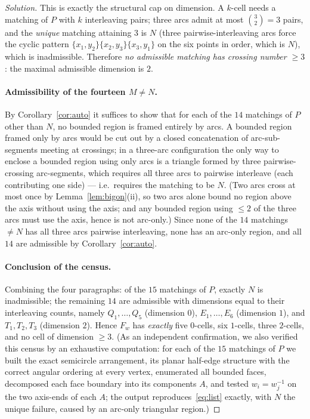 \documentclass{amsart}
\theoremstyle{definition}
\begin{document}
\begin{proof}[Solution]
This is exactly the structural cap on dimension. A $k$-cell needs a matching of $P$ with $k$
interleaving pairs; three arcs admit at most $\binom32=3$ pairs, and the \emph{unique} matching
attaining $3$ is $N$ (three pairwise-interleaving arcs force the cyclic pattern
$\{x_1,y_2\}\{x_2,y_3\}\{x_3,y_1\}$ on the six points in order, which is $N$), which is
inadmissible. Therefore \emph{no admissible matching has crossing number $\ge 3$}: the maximal
admissible dimension is $2$.

\paragraph{Admissibility of the fourteen $M\ne N$.}
By Corollary~\ref{cor:auto} it suffices to show that for each of the $14$ matchings of $P$ other
than $N$, no bounded region is framed entirely by arcs. A bounded region framed only by arcs
would be cut out by a closed concatenation of arc-sub-segments meeting at crossings; in a
three-arc configuration the only way to enclose a bounded region using only arcs is a triangle
formed by three pairwise-crossing arc-segments, which requires all three arcs to pairwise
interleave (each contributing one side) --- i.e.\ requires the matching to be $N$. (Two arcs
cross at most once by Lemma~\ref{lem:bigon}(ii), so two arcs alone bound no region above the
axis without using the axis; and any bounded region using $\le 2$ of the three arcs must use the
axis, hence is not arc-only.) Since none of the $14$ matchings $\ne N$ has all three arcs
pairwise interleaving, none has an arc-only region, and all $14$ are admissible by
Corollary~\ref{cor:auto}.

\paragraph{Conclusion of the census.}
Combining the four paragraphs: of the $15$ matchings of $P$, exactly $N$ is inadmissible; the
remaining $14$ are admissible with dimensions equal to their interleaving counts, namely
$Q_1,\dots,Q_5$ (dimension $0$), $E_1,\dots,E_6$ (dimension $1$), and $T_1,T_2,T_3$ (dimension
$2$). Hence $F_w$ has \emph{exactly} five $0$-cells, six $1$-cells, three $2$-cells, and no cell
of dimension $\ge 3$. (As an independent confirmation, we also verified this census by an
exhaustive computation: for each of the $15$ matchings of $P$ we built the exact semicircle
arrangement, its planar half-edge structure with the correct angular ordering at every vertex,
enumerated all bounded faces, decomposed each face boundary into its components $A$, and tested
$w_i=w_j^{-1}$ on the two axis-ends of each $A$; the output reproduces~\eqref{eq:list} exactly,
with $N$ the unique failure, caused by an arc-only triangular region.)


\end{proof}
\end{document}
